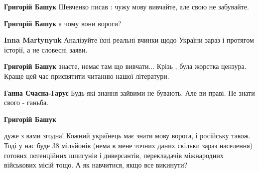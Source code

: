  
\textbf{Григорій Башук} Шевченко писав : чужу мову вивчайте, але свою не забувайте.

 
\textbf{Григорій Башук} а чому вони вороги?

 
\textbf{Inna Martynyuk} Аналізуйте їхні реальні вчинки щодо України зараз і протягом історії, а не словесні заяви.

 
\textbf{Григорій Башук} знаєте, немає там що вивчати...
Крізь , була жорстка цензура.
Краще цей час присвятити читанню нашої літератури.

 
\textbf{Ганна Счасна-Гарус} Будь-які знання зайвими не бувають. Але ви праві. Не знати свого - ганьба.

 
\textbf{Григорій Башук} 

дуже з вами згодна! Кожний українець має знати мову ворога, і російську також.
Тоді у нас буде 38 мільйонів (нема в мене точних даних скільки зараз населення)
готових потенційних шпигунів і диверсантів, перекладачів міжнародних військових
місій тощо. А як навчитися, якщо все викинути?

